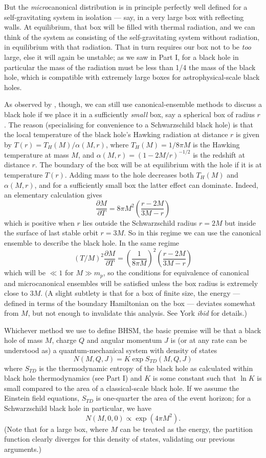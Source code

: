 \documentclass{article}
\newcommand{\pbp}[2]{\ensuremath{\frac{\partial #1}{\partial #2}}}
\newcommand{\be}{\begin{equation}}
\newcommand{\ee}{\end{equation}}
\begin{document}
But the \emph{micro}canonical distribution is in principle perfectly well defined for a self-gravitating system in isolation --- say, in a very large box with reflecting walls. At equilibrium, that box will be filled with thermal radiation, and we can think of the system as consisting of the self-gravitating system without radiation, in equilibrium with that radiation. That in turn requires our box not to be \emph{too} large, else it will again be unstable; as we saw in Part I, for a black hole in particular the mass of the radiation must be less than 1/4 the mass of the black hole, which is compatible with extremely large boxes for astrophysical-scale black holes.



As observed by , though, we can still use canonical-ensemble methods to discuss a black hole if we place it in a sufficiently \emph{small} box, say a spherical box of radius $r$. The reason (specialising for convenience to a Schwarzschild black hole) is that the local temperature of the black hole's Hawking radiation at distance $r$ is given by $T(r)=T_H(M)/\alpha(M,r)$, where $T_H(M)=1/8\pi M$ is the Hawking temperature at mass $M$, and $\alpha(M,r)=(1-2M/r)^{-1/2}$ is the redshift at distance $r$. The boundary of the box will be at equilibrium with the hole if it is at temperature $T(r)$. Adding mass to the hole decreases both $T_H(M)$ and $\alpha(M,r)$, and for a sufficiently small box the latter effect can dominate. Indeed, an elementary calculation gives
\be
\pbp{M}{T}=8\pi M^2 \left(\frac{r-2M}{3M-r}\right)
\ee
which is positive when $r$ lies outside the Schwarzschild radius $r=2M$ but inside the surface of last stable orbit $r=3M$. So in this regime we can use the canonical ensemble to describe the black hole. In the same regime 
\be
(T/M)^2\pbp{M}{T} = \left(\frac{1}{8 \pi M}\right)^2  \left(\frac{r-2M}{3M-r}\right)
\ee
which will be $\ll 1$ for $M \gg m_p$, so the conditions for equivalence of canonical and microcanonical ensembles will be satisfied unless the box radius is extremely close to $3M$. (A slight subtlety is that for a box of finite size, the energy --- defined in terms of the boundary Hamiltonian on the box --- deviates somewhat from $M$, but not enough to invalidate this analysis. See York \emph{ibid} for details.)



Whichever method we use to define BHSM, the basic premise will be that a black hole of mass $M$, charge $Q$ and angular momentum $J$ is (or at any rate can be understood as) a quantum-mechanical system with density of states
\be \label{densityofstates}
N(M,Q,J) = K \exp S_{TD}(M,Q,J)
\ee
where $S_{TD}$ is the thermodynamic entropy of the black hole as calculated within black hole thermodynamics (see Part I) and $K$ is some constant such that $\ln K$ is small compared to the area of a classical-scale black hole. If we assume the Einstein field equations, $S_{TD}$ is one-quarter the area of the event horizon; for a Schwarzschild black hole in particular, we have
\be
N(M,0,0) \propto\exp (4 \pi M^2).\ee
(Note that for a large box, where $M$ can be treated as the energy, the partition function clearly diverges for this density of states, validating our previous arguments.)
\end{document}

